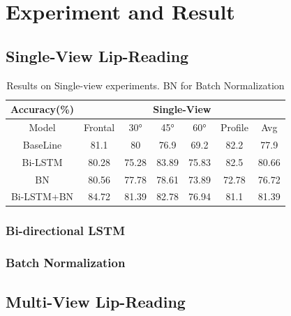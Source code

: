 
\section{Experiment and Result}

\subsection{Single-View Lip-Reading}


\begin{table}[h]
\centering
    \begin{tabular}{c|cccccc}
        \multicolumn{1}{c|}{Accuracy(\%)} &%
        \multicolumn{6}{c}{Single-View}\\ \hline
        Model  &%
        Frontal & 30\si{\degree}& 45\si{\degree} & 60\si{\degree} & Profile & Avg\\\hline
        BaseLine%
        &%
        81.1& 80& 76.9& 69.2& 82.2&77.9\\
        Bi-LSTM%
        &%
        80.28& 75.28& 83.89& 75.83& 82.5&80.66\\
        BN%
        &%
        80.56& 77.78& 78.61& 73.89& 72.78&76.72\\
        Bi-LSTM+BN%
        &%
        84.72& 81.39& 82.78& 76.94& 81.1&81.39\\
    \end{tabular}
    \caption{Results on Single-view experiments. BN for Batch Normalization}
    \label{tab:singletb}
\end{table}

\subsubsection{Bi-directional LSTM}
\subsubsection{Batch Normalization}



\subsection{Multi-View Lip-Reading}
